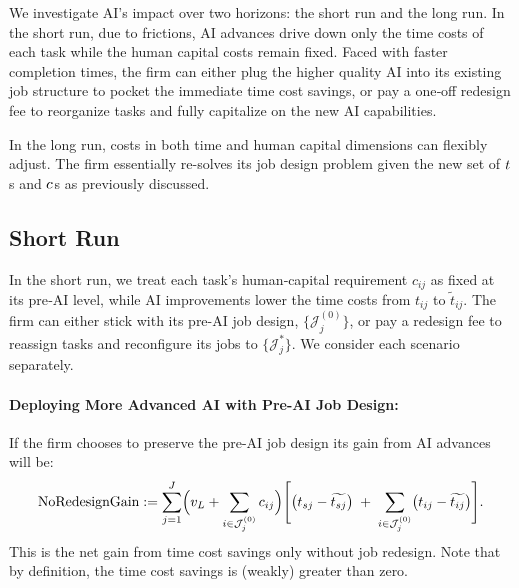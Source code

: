 \documentclass{article}
\theoremstyle{plain}
\theoremstyle{plain}
\begin{document}
We investigate AI’s impact over two horizons: the short run and the long run.
In the short run, due to frictions, AI advances drive down only the time costs of each task while the human capital costs remain fixed.
Faced with faster completion times, the firm can either plug the higher quality AI into its existing job structure to pocket the immediate time cost savings, or pay a one‐off redesign fee to reorganize tasks and fully capitalize on the new AI capabilities.

In the long run, costs in both time and human capital dimensions can flexibly adjust.
The firm essentially re-solves its job design problem given the new set of \(t_{}\)s and \(c_{}\)s as previously discussed.


\subsection{Short Run}

In the short run, we treat each task’s human‐capital requirement \(c_{ij}\) as fixed at its pre‐AI level, while AI improvements lower the time costs from \(t_{ij}\) to \(\widetilde t_{ij}\).  
The firm can either stick with its pre-AI job design, \(\{\mathcal{J}_j^{(0)}\}\), or pay a redesign fee to reassign tasks and reconfigure its jobs to \(\{\mathcal{J}_j^*\}\).
We consider each scenario separately.


\paragraph{Deploying More Advanced AI with Pre-AI Job Design:}
If the firm chooses to preserve the pre-AI job design its gain from AI advances will be:
\begin{equation}
\label{eq:no_redesign_gain}
\text{NoRedesignGain}
:=
\sum_{j=1}^{J}
\Bigl(v_L + \sum_{i\in\mathcal{J}_j^{(0)}}c_{ij}\Bigr)
\Biggl[
  \bigl(t_{sj} - \widetilde{t_{sj}}\bigr)
  \;+\;
  \sum_{i\in\mathcal{J}_j^{(0)}}\bigl(t_{ij} - \widetilde{t_{ij}}\bigr)
\Biggr].
\end{equation}
This is the net gain from time cost savings only without job redesign.
Note that by definition, the time cost savings is (weakly) greater than zero.
\end{document}
